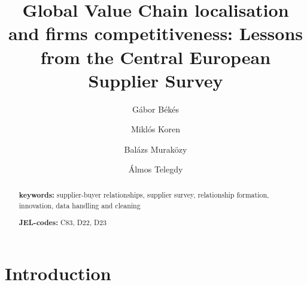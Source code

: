 \documentclass[final, dvipsnames, authoryear,12pt]{elsarticle}
\begin{document}
\begin{frontmatter}
\title{Global Value Chain localisation and firms competitiveness: Lessons from the Central European Supplier Survey}






\author[gb]{G\'{a}bor B\'{e}k\'{e}s}
\author[mk]{Miklós Koren}
\author[bm]{Balázs Muraközy}
\author[at]{Álmos Telegdy}
 \address[gb]{Central European University, Institute of Economics and CEPR}
 \address[mk]{Central European University, Institute of Economics and CEPR}
 \address[bm]{University of Liverpool, Institute of Economics }
 \address[at]{National Bank of Hungary}
 
 




\begin{abstract}

    
       \vspace{2mm} 
   
   \textbf{keywords:} supplier-buyer relationships, supplier survey, relationship formation, innovation, data handling and cleaning 
   
    \vspace{2mm}
    
   \textbf{JEL-codes:} C83, D22, D23 
\end{abstract}


\end{frontmatter}

\section{Introduction}
\end{document}
